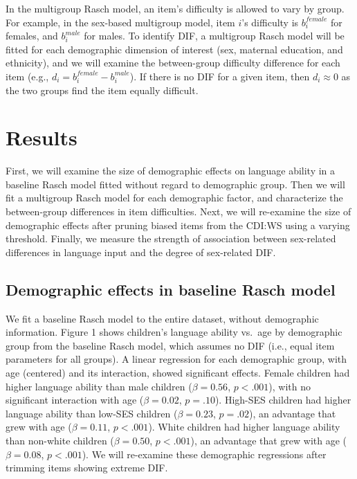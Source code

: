 \documentclass[10pt, letterpaper]{article}
\begin{document}
In the multigroup Rasch model, an item's difficulty is allowed to vary
by group. For example, in the sex-based multigroup model, item \(i\)'s
difficulty is \(b_{i}^{female}\) for females, and \(b_{i}^{male}\) for
males. To identify DIF, a multigroup Rasch model will be fitted for each
demographic dimension of interest (sex, maternal education, and
ethnicity), and we will examine the between-group difficulty difference
for each item (e.g., \(d_i = b_{i}^{female} - b_{i}^{male}\)). If there
is no DIF for a given item, then \(d_i \approx 0\) as the two groups
find the item equally difficult.

\hypertarget{results}{%
\section{Results}\label{results}}

First, we will examine the size of demographic effects on language
ability in a baseline Rasch model fitted without regard to demographic
group. Then we will fit a multigroup Rasch model for each demographic
factor, and characterize the between-group differences in item
difficulties. Next, we will re-examine the size of demographic effects
after pruning biased items from the CDI:WS using a varying threshold.
Finally, we measure the strength of association between sex-related
differences in language input and the degree of sex-related DIF.

\hypertarget{demographic-effects-in-baseline-rasch-model}{%
\subsection{Demographic effects in baseline Rasch
model}\label{demographic-effects-in-baseline-rasch-model}}

We fit a baseline Rasch model to the entire dataset, without demographic
information. Figure 1 shows children's language ability vs.~age by
demographic group from the baseline Rasch model, which assumes no DIF
(i.e., equal item parameters for all groups). A linear regression for
each demographic group, with age (centered) and its interaction, showed
significant effects. Female children had higher language ability than
male children (\(\beta=0.56\), \(p<.001\)), with no significant
interaction with age (\(\beta=0.02\), \(p=.10\)). High-SES children had
higher language ability than low-SES children (\(\beta=0.23\),
\(p=.02\)), an advantage that grew with age (\(\beta=0.11\),
\(p<.001\)). White children had higher language ability than non-white
children (\(\beta=0.50\), \(p<.001\)), an advantage that grew with age
(\(\beta=0.08\), \(p<.001\)). We will re-examine these demographic
regressions after trimming items showing extreme DIF.
\end{document}
